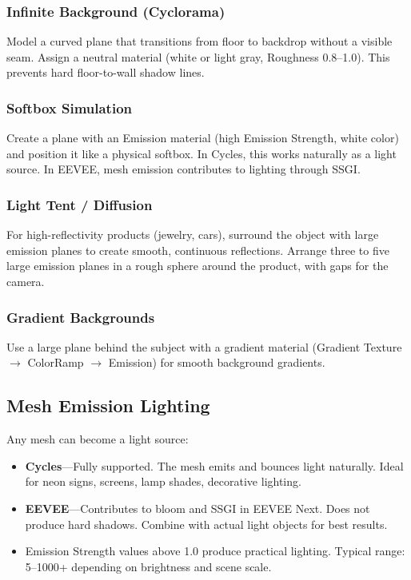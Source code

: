 \subsubsection{Infinite Background (Cyclorama)}

Model a curved plane that transitions from floor to backdrop without
a visible seam. Assign a neutral material (white or light gray,
Roughness 0.8--1.0). This prevents hard floor-to-wall shadow lines.

\subsubsection{Softbox Simulation}

Create a plane with an Emission material (high Emission Strength,
white color) and position it like a physical softbox. In Cycles,
this works naturally as a light source. In EEVEE, mesh emission
contributes to lighting through SSGI.

\subsubsection{Light Tent / Diffusion}

For high-reflectivity products (jewelry, cars), surround the object
with large emission planes to create smooth, continuous reflections.
Arrange three to five large emission planes in a rough sphere around
the product, with gaps for the camera.

\subsubsection{Gradient Backgrounds}

Use a large plane behind the subject with a gradient material
(Gradient Texture $\rightarrow$ ColorRamp $\rightarrow$ Emission)
for smooth background gradients.

\subsection{Mesh Emission Lighting}

Any mesh can become a light source:

\begin{itemize}[leftmargin=2em]
  \item \textbf{Cycles}---Fully supported. The mesh emits and
        bounces light naturally. Ideal for neon signs, screens,
        lamp shades, decorative lighting.
  \item \textbf{EEVEE}---Contributes to bloom and SSGI in EEVEE
        Next. Does not produce hard shadows. Combine with actual
        light objects for best results.
  \item Emission Strength values above 1.0 produce practical
        lighting. Typical range: 5--1000+ depending on brightness
        and scene scale.
\end{itemize}


